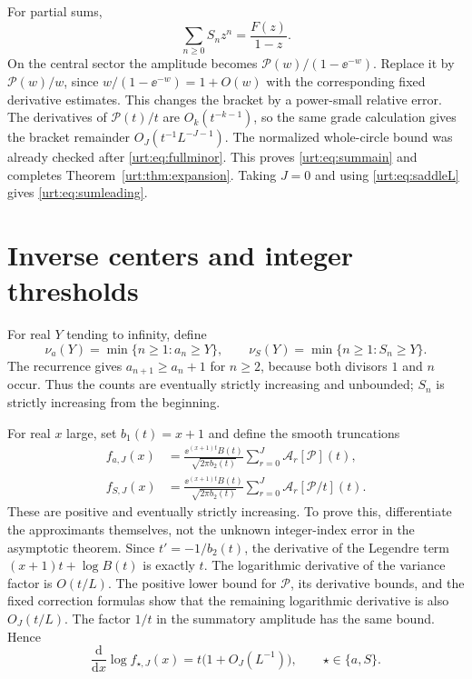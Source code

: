 \documentclass[11pt,letterpaper]{article}
\theoremstyle{remark}\newtheorem{remark}[theorem]{Remark}
\newcommand{\Pc}{\mathcal P}\newcommand{\Bc}{\mathcal B}\newcommand{\dd}{\mathrm d}
\begin{document}
For partial sums,
\[
 \sum_{n\ge0}S_nz^n=\frac{F(z)}{1-z}.
\]
On the central sector the amplitude becomes $\Pc(w)/(1-\ee^{-w})$. Replace it by $\Pc(w)/w$, since $w/(1-\ee^{-w})=1+O(w)$ with the corresponding fixed derivative estimates. This changes the bracket by a power-small relative error. The derivatives of $\Pc(t)/t$ are $O_k(t^{-k-1})$, so the same grade calculation gives the bracket remainder $O_J(t^{-1}L^{-J-1})$. The normalized whole-circle bound was already checked after \eqref{urt:eq:fullminor}. This proves \eqref{urt:eq:summain} and completes Theorem~\ref{urt:thm:expansion}. Taking $J=0$ and using \eqref{urt:eq:saddleL} gives \eqref{urt:eq:sumleading}.

\section{Inverse centers and integer thresholds}\label{urt:sec:inverse}
For real $Y$ tending to infinity, define
\[
 \nu_a(Y)=\min\{n\ge1:a_n\ge Y\},\qquad
 \nu_S(Y)=\min\{n\ge1:S_n\ge Y\}.
\]
The recurrence gives $a_{n+1}\ge a_n+1$ for $n\ge2$, because both divisors $1$ and $n$ occur. Thus the counts are eventually strictly increasing and unbounded; $S_n$ is strictly increasing from the beginning.

For real $x$ large, set $b_1(t)=x+1$ and define the smooth truncations
\begin{align}
 f_{a,J}(x)&=\frac{\ee^{(x+1)t}B(t)}{\sqrt{2\pi b_2(t)}}
       \sum_{r=0}^J\mathcal A_r[\Pc](t),\label{urt:eq:faJ}\\
 f_{S,J}(x)&=\frac{\ee^{(x+1)t}B(t)}{\sqrt{2\pi b_2(t)}}
       \sum_{r=0}^J\mathcal A_r[\Pc/t](t).\label{urt:eq:fSJ}
\end{align}
These are positive and eventually strictly increasing. To prove this, differentiate the approximants themselves, not the unknown integer-index error in the asymptotic theorem. Since $t'=-1/b_2(t)$, the derivative of the Legendre term $(x+1)t+\log B(t)$ is exactly $t$. The logarithmic derivative of the variance factor is $O(t/L)$. The positive lower bound for $\Pc$, its derivative bounds, and the fixed correction formulas show that the remaining logarithmic derivative is also $O_J(t/L)$. The factor $1/t$ in the summatory amplitude has the same bound. Hence
\begin{equation}\label{urt:eq:inverseslope}
 \frac{\dd}{\dd x}\log f_{\star,J}(x)=t\bigl(1+O_J(L^{-1})\bigr),
 \qquad \star\in\{a,S\}.
\end{equation}
\end{document}
